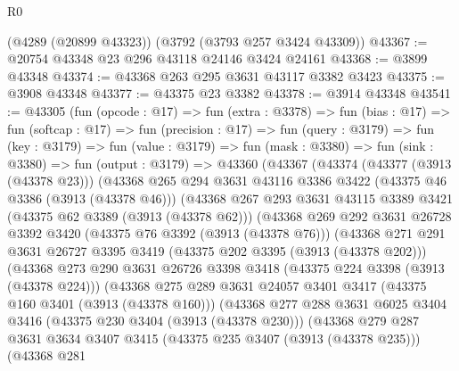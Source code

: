 \begin{lexlean}{R0}
\begin{coremodule}
    (@4289 (@20899 @43323))
    (@3792 (@3793 @257 @3424 @43309))
@43367 := @20754 @43348 @23 @296 @43118 @24146 @3424 @24161
@43368 := @3899 @43348
@43374 := @43368 @263 @295 @3631 @43117 @3382 @3423
@43375 := @3908 @43348
@43377 := @43375 @23 @3382
@43378 := @3914 @43348
@43541 := @43305
    (fun (opcode : @17) =>
    fun (extra : @3378) =>
    fun (bias : @17) =>
    fun (softcap : @17) =>
    fun (precision : @17) =>
    fun (query : @3179) =>
    fun (key : @3179) =>
    fun (value : @3179) =>
    fun (mask : @3380) =>
    fun (sink : @3380) =>
    fun (output : @3179) =>
    @43360
      (@43367
        (@43374
          (@43377 (@3913 (@43378 @23)))
          (@43368
            @265
            @294
            @3631
            @43116
            @3386
            @3422
            (@43375 @46 @3386 (@3913 (@43378 @46)))
            (@43368
              @267
              @293
              @3631
              @43115
              @3389
              @3421
              (@43375 @62 @3389 (@3913 (@43378 @62)))
              (@43368
                @269
                @292
                @3631
                @26728
                @3392
                @3420
                (@43375 @76 @3392 (@3913 (@43378 @76)))
                (@43368
                  @271
                  @291
                  @3631
                  @26727
                  @3395
                  @3419
                  (@43375 @202 @3395 (@3913 (@43378 @202)))
                  (@43368
                    @273
                    @290
                    @3631
                    @26726
                    @3398
                    @3418
                    (@43375 @224 @3398 (@3913 (@43378 @224)))
                    (@43368
                      @275
                      @289
                      @3631
                      @24057
                      @3401
                      @3417
                      (@43375 @160 @3401 (@3913 (@43378 @160)))
                      (@43368
                        @277
                        @288
                        @3631
                        @6025
                        @3404
                        @3416
                        (@43375 @230 @3404 (@3913 (@43378 @230)))
                        (@43368
                          @279
                          @287
                          @3631
                          @3634
                          @3407
                          @3415
                          (@43375 @235 @3407 (@3913 (@43378 @235)))
                          (@43368
                            @281

\end{coremodule}
\end{lexlean}
